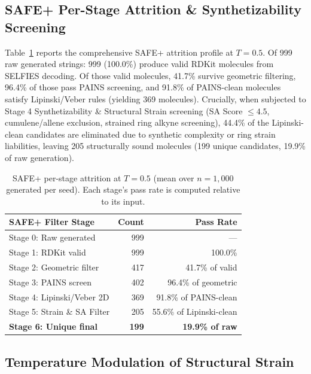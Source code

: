 \documentclass[conference]{IEEEtran}
\begin{document}
\subsection{SAFE+ Per-Stage Attrition \& Synthetizability Screening}

Table~\ref{tab:attrition} reports the comprehensive SAFE+ attrition profile at $T{=}0.5$. Of 999 raw generated strings: 999 (100.0\%) produce valid RDKit molecules from SELFIES decoding. Of those valid molecules, 41.7\% survive geometric filtering, 96.4\% of those pass PAINS screening, and 91.8\% of PAINS-clean molecules satisfy Lipinski/Veber rules (yielding 369 molecules). Crucially, when subjected to Stage 4 Synthetizability \& Structural Strain screening (SA Score $\le 4.5$, cumulene/allene exclusion, strained ring alkyne screening), 44.4\% of the Lipinski-clean candidates are eliminated due to synthetic complexity or ring strain liabilities, leaving 205 structurally sound molecules (199 unique candidates, 19.9\% of raw generation).

\begin{table}[!t]
\centering
\caption{SAFE+ per-stage attrition at $T{=}0.5$ (mean over $n{=}1{,}000$ generated per seed). Each stage's pass rate is computed relative to its input.}
\label{tab:attrition}
\begin{tabular}{l r r}
\toprule
\textbf{SAFE+ Filter Stage} & \textbf{Count} & \textbf{Pass Rate} \\
\midrule
Stage 0: Raw generated          & 999 & ---    \\
Stage 1: RDKit valid            & 999 & 100.0\% \\
Stage 2: Geometric filter       & 417 & 41.7\% of valid \\
Stage 3: PAINS screen           & 402 & 96.4\% of geometric \\
Stage 4: Lipinski/Veber 2D      & 369 & 91.8\% of PAINS-clean \\
Stage 5: Strain \& SA Filter    & 205 & 55.6\% of Lipinski-clean \\
\midrule
\textbf{Stage 6: Unique final}  & \textbf{199} & \textbf{19.9\% of raw} \\
\bottomrule
\end{tabular}
\end{table}

\subsection{Temperature Modulation of Structural Strain}
\end{document}
